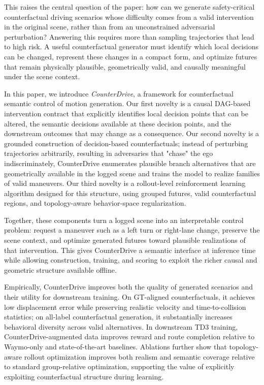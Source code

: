 \documentclass{article}
\newcommand{\zhou}[1]{{\textsf{\textcolor{red}{[Zhou: #1]}}}}
\begin{document}
This raises the central question of the paper: how can we generate safety-critical counterfactual driving scenarios whose difficulty comes from a valid intervention in the original scene, rather than from an unconstrained adversarial perturbation? Answering this requires more than sampling trajectories that lead to high risk. A useful counterfactual generator must identify which local decisions can be changed, represent these changes in a compact form, and optimize futures that remain physically plausible, geometrically valid, and causally meaningful under the scene context.

In this paper, we introduce \emph{CounterDrive}, a framework for counterfactual semantic control of motion generation. Our first novelty is a causal DAG-based intervention contract that explicitly identifies local decision points that can be altered, the semantic decisions available at these decision points, and the downstream outcomes that may change as a consequence. Our second novelty is a grounded construction of decision-based counterfactuals; instead of perturbing trajectories arbitrarily, resulting in adversaries that "chase" the ego indiscriminately, CounterDrive enumerates plausible branch alternatives that are geometrically available in the logged scene and trains the model to realize families of valid maneuvers. Our third novelty is a rollout-level reinforcement learning algorithm designed for this structure, using grouped futures, valid counterfactual regions, and topology-aware behavior-space regularization.

Together, these components turn a logged scene into an interpretable control problem: request a maneuver such as a left turn or right-lane change, preserve the scene context, and optimize generated futures toward plausible realizations of that intervention. This gives CounterDrive a semantic interface at inference time while allowing construction, training, and scoring to exploit the richer causal and geometric structure available offline.

Empirically, CounterDrive improves both the quality of generated scenarios and their utility for downstream training. On GT-aligned counterfactuals, it achieves low displacement error while preserving realistic velocity and time-to-collision statistics; on all-label counterfactual generation, it substantially increases behavioral diversity across valid alternatives. In downstream TD3 training, CounterDrive-augmented data improves reward and route completion relative to Waymo-only and state-of-the-art baselines. Ablations further show that topology-aware rollout optimization improves both realism and semantic coverage relative to standard group-relative optimization, supporting the value of explicitly exploiting counterfactual structure during learning.
\end{document}
